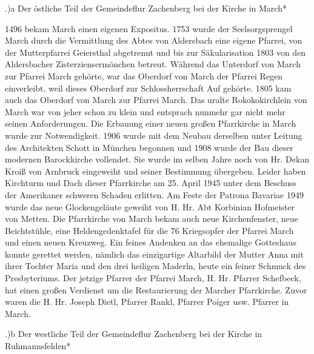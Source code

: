 .)a Der östliche Teil der Gemeindeflur Zachenberg bei der Kirche in March*

1496 bekam March einen eigenen Expositus. 1753 wurde der Seelsorgsprengel March
durch die Vermittlung des Abtes von Aldersbach eine eigene Pfarrei, von der
Mutterpfarrei Geiersthal abgetrennt und bis zur Säkularisation 1803 von den
Aldersbacher Zisterziensermönchen betreut. Während das Unterdorf von March zur
Pfarrei March gehörte, war das Oberdorf von March der Pfarrei Regen einverleibt,
weil dieses Oberdorf zur Schlossherrschaft Auf gehörte. 1805 kam auch das
Oberdorf von March zur Pfarrei March. Das uralte Rokokokirchlein von March war
von jeher schon zu klein und entsprach nunmehr gar nicht mehr seinen
Anforderungen. Die Erbauung einer neuen großen Pfarrkirche in March wurde zur
Notwendigkeit. 1906 wurde mit dem Neubau derselben unter Leitung des Architekten
Schott in München begonnen und 1908 wurde der Bau dieser modernen Barockkirche
vollendet. Sie wurde im selben Jahre noch von Hr. Dekan Kroiß von Arnbruck
eingeweiht und seiner Bestimmung übergeben. Leider haben Kirchturm und Dach
dieser Pfarrkirche am 25. April 1945 unter dem Beschuss der Amerikaner schweren
Schaden erlitten. Am Feste der Patrona Bavariae 1949 wurde das neue
Glockengeläute geweiht von H. Hr. Abt Korbinian Hofmeister von Metten. Die
Pfarrkirche von March bekam auch neue Kirchenfenster, neue Beichtstühle, eine
Heldengedenktafel für die 76 Kriegsopfer der Pfarrei March und einen neuen
Kreuzweg. Ein feines Andenken an das ehemalige Gotteshaus konnte gerettet
werden, nämlich das einzigartige Altarbild der Mutter Anna mit ihrer Tochter
Maria und den drei heiligen Maderln, heute ein feiner Schmuck des Presbyteriums.
Der jetzige Pfarrer der Pfarrei March, H. Hr. Pfarrer Schefbeck, hat einen
großen Verdienst um die Restaurierung der Marcher Pfarrkirche. Zuvor waren die
H. Hr. Joseph Dietl, Pfarrer Rankl, Pfarrer Poiger usw. Pfarrer in March.

.)b Der westliche Teil der Gemeindeflur Zachenberg bei der Kirche in
Ruhmannsfelden*

